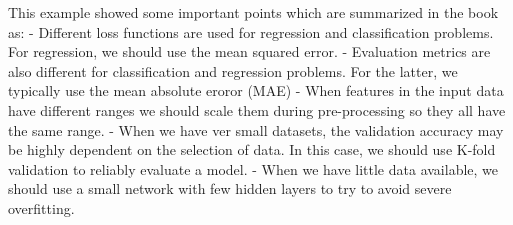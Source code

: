\documentclass[11pt]{article}
\begin{document}
This example showed some important points which are summarized in the
book as: - Different loss functions are used for regression and
classification problems. For regression, we should use the mean squared
error. - Evaluation metrics are also different for classification and
regression problems. For the latter, we typically use the mean absolute
eroror (MAE) - When features in the input data have different ranges we
should scale them during pre-processing so they all have the same range.
- When we have ver small datasets, the validation accuracy may be highly
dependent on the selection of data. In this case, we should use K-fold
validation to reliably evaluate a model. - When we have little data
available, we should use a small network with few hidden layers to try
to avoid severe overfitting.


    
    
    
    
\end{document}
